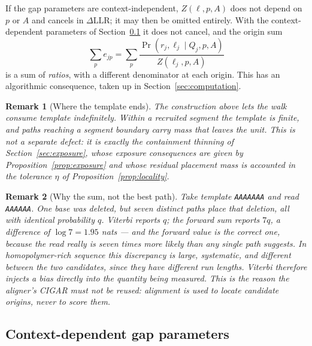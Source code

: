 \documentclass[11pt]{article}
\newtheorem{remark}{Remark}
\newcommand{\Prob}{\Pr}
\begin{document}
If the gap parameters are context-independent, $Z(\ell,p,A)$ does not depend on
$p$ or $A$ and cancels in $\Delta\mathrm{LLR}$; it may then be omitted
entirely.  With the context-dependent parameters of Section~\ref{sec:context}
it does not cancel, and the origin sum
\begin{equation}
    \sum_p e_{jp}
    = \sum_p \frac{\Prob(r_j,\ell_j\mid Q_j,p,A)}{Z(\ell_j,p,A)}
\label{eq:origin-sum-normalised}
\end{equation}
is a sum of \emph{ratios}, with a different denominator at each origin.  This
has an algorithmic consequence, taken up in Section~\ref{sec:computation}.

\begin{remark}[Where the template ends]
The construction above lets the walk consume template indefinitely.  Within a
recruited segment the template is finite, and paths reaching a segment boundary
carry mass that leaves the unit.  This is not a separate defect: it is exactly
the containment thinning of Section~\ref{sec:exposure}, whose exposure
consequences are given by Proposition~\ref{prop:exposure} and whose residual
placement mass is accounted in the tolerance $\eta$ of
Proposition~\ref{prop:locality}.
\end{remark}

\begin{remark}[Why the sum, not the best path]
\label{rem:viterbi}
Take template \texttt{AAAAAAA} and read \texttt{AAAAAA}.  One base was deleted,
but seven distinct paths place that deletion, all with identical probability
$q$.  Viterbi reports $q$; the forward sum reports $7q$, a difference of
$\log 7 = 1.95$ nats --- and the forward value is the correct one, because the
read really is seven times more likely than any single path suggests.  In
homopolymer-rich sequence this discrepancy is large, systematic, and
\emph{different between the two candidates}, since they have different run
lengths.  Viterbi therefore injects a bias directly into the quantity being
measured.  This is the reason the aligner's CIGAR must not be reused: alignment
is used to \emph{locate} candidate origins, never to score them.
\end{remark}

\subsection{Context-dependent gap parameters}
\label{sec:context}
\end{document}
